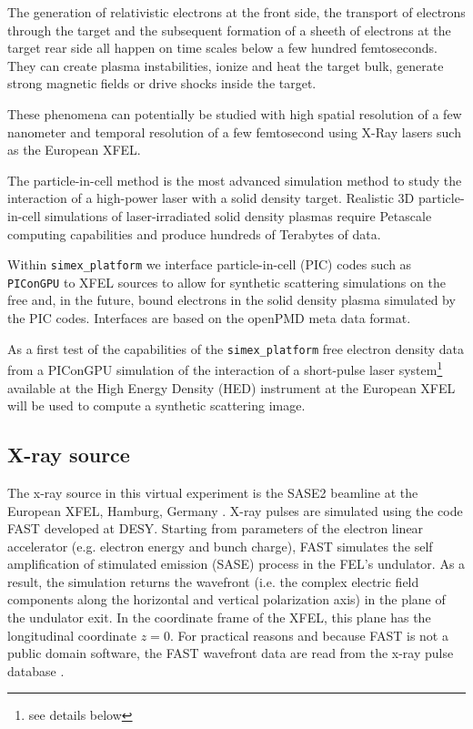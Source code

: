 \documentclass[a4paper]{article}
\begin{document}
The generation of relativistic electrons at the front side, the transport of electrons through the target and the subsequent formation of a sheeth of electrons at the target rear side all happen on time scales below a few hundred femtoseconds. They can create plasma instabilities, ionize and heat the target bulk, generate strong magnetic fields or drive shocks inside the target.

These phenomena can potentially be studied with high spatial resolution of a few nanometer and temporal resolution of a few femtosecond using X-Ray lasers such as the European XFEL.

The particle-in-cell method is the most advanced simulation method to study the interaction of a high-power laser with a solid density target. Realistic 3D particle-in-cell simulations of laser-irradiated solid density plasmas require Petascale computing capabilities and produce hundreds of Terabytes of data.

Within \texttt{simex\_platform} we interface particle-in-cell (PIC) codes such as \texttt{PIConGPU} to XFEL sources to allow for synthetic scattering simulations on the free and, in the future, bound electrons in the solid density plasma simulated by the PIC codes. Interfaces are based on the openPMD meta data format.

As a first test of the capabilities of the \texttt{simex\_platform} free electron density data from a PIConGPU simulation of the interaction of a short-pulse laser system\footnote{see details below} available at the High Energy Density (HED) instrument \cite{Nakatsutsumi2014} at the European XFEL will be used to compute a synthetic scattering image.
%
\subsection{X-ray source}
The x-ray source in this virtual experiment is the SASE2 beamline at the European XFEL, Hamburg, Germany \cite{Tschentscher2011}.
X-ray pulses are simulated using the code FAST \cite{Saldin1999} developed at DESY. Starting from parameters of the electron linear accelerator
(e.g. electron energy and bunch charge), FAST simulates the self amplification of stimulated emission (SASE) process \cite{} in the FEL's
undulator. As a result, the simulation returns the wavefront (i.e. the complex electric field components
along the horizontal and vertical polarization axis) in the plane of the undulator exit. In the coordinate frame of the
XFEL, this plane has the longitudinal coordinate $z=0$. For practical reasons and because FAST is not a public domain software,
the FAST wavefront data are read from the x-ray pulse database \cite{xpd_xfel}.
\end{document}
